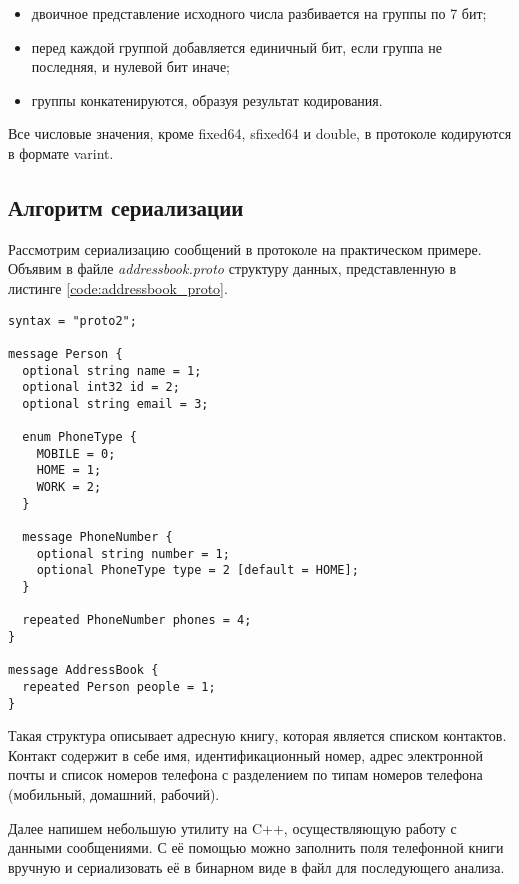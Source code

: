 \begin{itemize}
    \item двоичное представление исходного числа разбивается на группы по 7 бит;
    \item перед каждой группой добавляется единичный бит, если группа не последняя, и нулевой бит иначе;
    \item группы конкатенируются, образуя результат кодирования.
\end{itemize}

Все числовые значения, кроме fixed64, sfixed64 и double, в протоколе кодируются в формате varint.

\subsection{Алгоритм сериализации}

Рассмотрим сериализацию сообщений в протоколе на практическом примере. Объявим в файле \textit{addressbook.proto} 
структуру данных, представленную в листинге \ref{code:addressbook_proto}.

\noindent\begin{minipage}{\linewidth}
\begin{lstlisting}[style=CodeListing, label=code:addressbook_proto, caption={Protobuf-сообщения AddressBook и Person}]
syntax = "proto2";

message Person {
  optional string name = 1;
  optional int32 id = 2;
  optional string email = 3;

  enum PhoneType {
    MOBILE = 0;
    HOME = 1;
    WORK = 2;
  }

  message PhoneNumber {
    optional string number = 1;
    optional PhoneType type = 2 [default = HOME];
  }

  repeated PhoneNumber phones = 4;
}

message AddressBook {
  repeated Person people = 1;
}
\end{lstlisting}
\end{minipage}

Такая структура описывает адресную книгу, которая является списком контактов.
Контакт содержит в себе имя, идентификационный номер, адрес электронной почты и список номеров
телефона с разделением по типам номеров телефона (мобильный, домашний, рабочий).

Далее напишем небольшую утилиту на C++, осуществляющую работу с данными сообщениями. С её помощью можно заполнить поля телефонной книги вручную и сериализовать её в бинарном виде в файл для последующего анализа.

